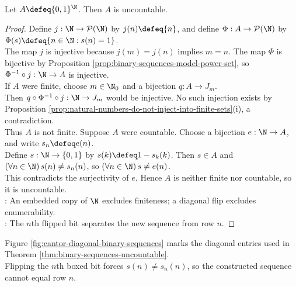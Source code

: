 \begin{theorem} \label{thm:binary-sequences-uncountable} \\
Let $A\defeq\{0,1\}^{\N}$. Then $A$ is uncountable.
\begin{proof} Define $j:\N\to\mathcal{P}(\N)$ by $j(n)\defeq\{n\}$, and define $\Phi:A\to\mathcal{P}(\N)$ by $\Phi(s)\defeq\{n\in\N:s(n)=1\}$.\\
The map $j$ is injective because $j(m)=j(n)$ implies $m=n$. The map $\Phi$ is bijective by Proposition \ref{prop:binary-sequences-model-power-set}, so $\Phi^{-1}\circ j:\N\to A$ is injective.\\
If $A$ were finite, choose $m\in\N_0$ and a bijection $q:A\to J_m$.\\
Then $q\circ\Phi^{-1}\circ j:\N\to J_m$ would be injective. No such injection exists by Proposition \ref{prop:natural-numbers-do-not-inject-into-finite-sets}(i), a contradiction.\\
Thus $A$ is not finite. Suppose $A$ were countable. Choose a bijection $e:\N\to A$, and write $s_n\defeq e(n)$.\\
Define $s:\N\to\{0,1\}$ by $s(k)\defeq1-s_k(k)$. Then $s\in A$ and $(\forall n\in\N)\,s(n)\neq s_n(n)$, so $(\forall n\in\N)\,s\neq e(n)$.\\
This contradicts the surjectivity of $e$. Hence $A$ is neither finite nor countable, so it is uncountable.\\
: An embedded copy of $\N$ excludes finiteness; a diagonal flip excludes enumerability.\\
: The $n$th flipped bit separates the new sequence from row $n$.
\end{proof}
\end{theorem}

\begin{illustrationfigure}[H]
  \centering
  
  \caption{Boxed entries $a_{nn}=s_n(n)$ whose bit flips define a sequence distinct from every listed row.}
  \label{fig:cantor-diagonal-binary-sequences}
\end{illustrationfigure}

Figure \ref{fig:cantor-diagonal-binary-sequences} marks the diagonal entries used in Theorem \ref{thm:binary-sequences-uncountable}.\\
Flipping the $n$th boxed bit forces $s(n)\neq s_n(n)$, so the constructed sequence cannot equal row $n$.
